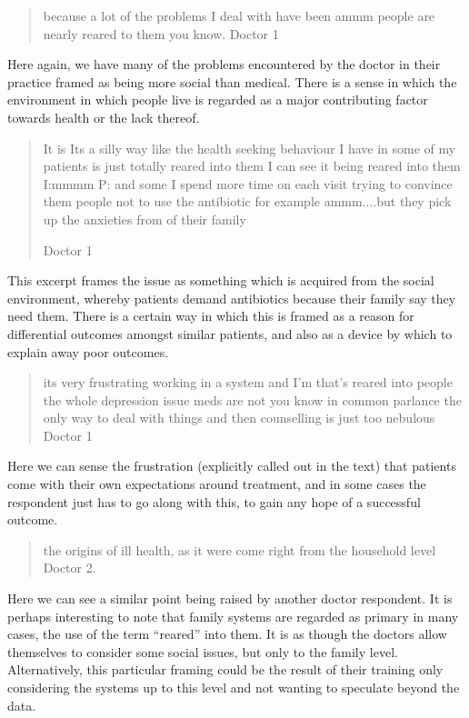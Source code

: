 \begin{quotation}
  because a lot of the problems I deal with have been ammm people are nearly reared to them you know. 
Doctor 1
\end{quotation}


Here again, we have many of the problems encountered by the doctor in their practice framed as  being more social than medical. There is a sense in which the environment in which people live is regarded as a major contributing factor towards health or the lack thereof. 

\begin{quotation}
  It is Its a silly way like the health seeking behaviour I have in some of my patients is just totally reared into them I can see it being reared into them 
I:mmmm
P: and some I spend more time on each visit trying to convince them people not to use the antibiotic for example ammm....but they pick up the anxieties from of their family

Doctor 1
\end{quotation}


This excerpt frames the issue as something which is acquired from the social environment, whereby patients demand antibiotics because their family say they need them. There is a certain way in which this is framed as a reason for differential outcomes amongst similar patients, and also as a device by which to explain away poor outcomes. 

\begin{quotation}
  its very frustrating working in a system and I'm that's reared into people the whole depression issue meds are not you know in common parlance the only way to deal with things and then counselling is just too nebulous 
Doctor 1
\end{quotation}

Here we can sense the frustration (explicitly called out in the text) that patients come with their own expectations around treatment, and in some cases the respondent just has to go along with this, to gain any hope of a successful outcome. 

\begin{quotation}
   the origins of ill health, as it were come right from the household level
Doctor 2.
\end{quotation}

Here we can see a similar point being raised by another doctor respondent. It is perhaps interesting to note that family systems are regarded as primary in many cases, the use of the term ``reared'' into them. It is as though the doctors allow themselves to consider some social issues, but only to the family level. Alternatively, this particular framing could be the result of their training only considering the systems up to this level and not wanting to speculate beyond the data. 


